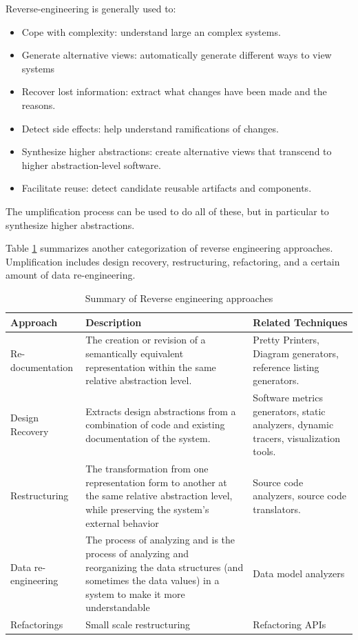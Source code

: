 Reverse-engineering is generally used to:
\begin{itemize}
\item Cope with complexity: understand large an complex systems.
\item Generate alternative views: automatically generate different ways to view systems
\item Recover lost information: extract what changes have been made and the reasons.
\item Detect side effects: help understand ramifications of changes.
\item Synthesize higher abstractions:  create alternative views that transcend to higher abstraction-level software.
\item Facilitate reuse: detect candidate reusable artifacts and components.
\end{itemize}

The umplification process can be used to do all of these, but in particular to synthesize higher abstractions.

Table \ref{table:approachesRE} summarizes another categorization  of reverse engineering approaches\cite{Chikofsky}. Umplification includes design recovery, restructuring, refactoring, and a certain amount of data re-engineering.

\begin{table}[h]
\caption{Summary of Reverse engineering approaches \cite{Chikofsky}}
\label{table:approachesRE}
\begin{tabularx}{\textwidth}{X|X|X}
\toprule
\rowcolor[HTML]{BBDAFF}
\textbf{Approach} & \textbf{Description}  & \textbf{Related Techniques}  \\ \hline
Re-documentation & The creation or revision of a semantically equivalent representation within the same relative abstraction level. & Pretty Printers, Diagram generators, reference listing generators. \\ \hline

Design Recovery & Extracts design abstractions from a combination of code and existing documentation of the system. & Software metrics generators, static analyzers, dynamic tracers, visualization tools. \\ \hline

Restructuring & The transformation from one representation form to another at the same relative  abstraction level, while preserving the system's external behavior & Source code analyzers, source code translators.   \\ \hline

Data re-engineering & The process of analyzing and is the process of analyzing and
reorganizing the data structures (and sometimes the data values) in a system to make it more understandable & Data model analyzers  \\ \hline

Refactorings & Small scale restructuring & Refactoring APIs \\ \hline  
 
\end{tabularx}
\end{table}

